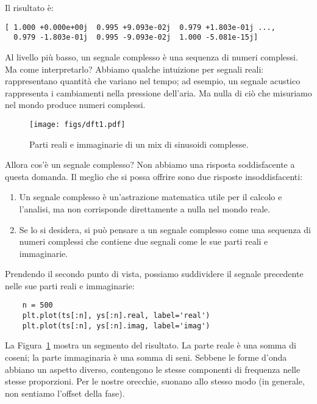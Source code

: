 \documentclass[12pt,a4paper]{book}
\begin{document}
Il risultato è:

\begin{verbatim} 
[ 1.000 +0.000e+00j  0.995 +9.093e-02j  0.979 +1.803e-01j ...,
  0.979 -1.803e-01j  0.995 -9.093e-02j  1.000 -5.081e-15j]
 \end{verbatim} 

Al livello più basso, un segnale complesso è una sequenza di numeri complessi. Ma come interpretarlo? Abbiamo qualche intuizione per segnali reali: rappresentano quantità che variano nel tempo; ad esempio, un segnale acustico rappresenta i cambiamenti nella pressione dell'aria. Ma nulla di ciò che misuriamo nel mondo produce numeri complessi.

\begin{figure} 

\centerline{\texttt{[image: figs/dft1.pdf]}} \caption{Parti reali e immaginarie di un mix di sinusoidi complesse.} \label{fig.dft1} \end{figure} 

Allora cos'è un segnale complesso? Non abbiamo una risposta soddisfacente a questa domanda. Il meglio che si possa offrire sono due risposte insoddisfacenti:

\begin{enumerate} 

\item Un segnale complesso è un'astrazione matematica utile per il calcolo e l'analisi, ma non corrisponde direttamente a nulla nel mondo reale.

\item Se lo si desidera, si può pensare a un segnale complesso come una sequenza di numeri complessi che contiene due segnali come le sue parti reali e immaginarie.

\end{enumerate} 

Prendendo il secondo punto di vista, possiamo suddividere il segnale precedente nelle sue parti reali e immaginarie:

\begin{verbatim} 
    n = 500
    plt.plot(ts[:n], ys[:n].real, label='real')
    plt.plot(ts[:n], ys[:n].imag, label='imag')
 \end{verbatim} 

La Figura~\ref{fig.dft1} mostra un segmento del risultato. La parte reale è una somma di coseni; la parte immaginaria è una somma di seni. Sebbene le forme d'onda abbiano un aspetto diverso, contengono le stesse componenti di frequenza nelle stesse proporzioni. Per le nostre orecchie, suonano allo stesso modo (in generale, non sentiamo l'offset della fase).
\end{document}
